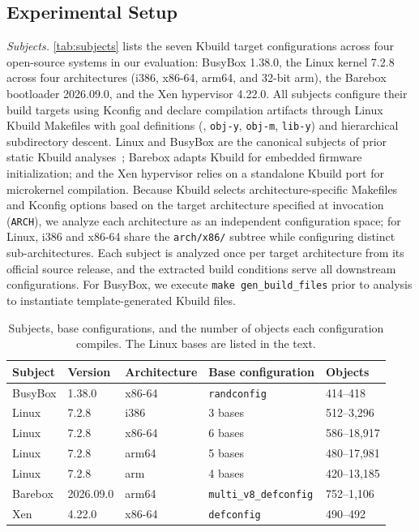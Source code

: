 \documentclass[acmsmall,screen,review,anonymous,nonacm]{acmart}
\begin{document}
\subsection{Experimental Setup}\label{sec:setup}

\emph{Subjects.}
\autoref{tab:subjects} lists the seven Kbuild target configurations across four open-source systems in our evaluation: BusyBox 1.38.0, the Linux kernel 7.2.8 across four architectures (i386, x86-64, arm64, and 32-bit arm), the Barebox bootloader 2026.09.0, and the Xen hypervisor 4.22.0.
All subjects configure their build targets using Kconfig and declare compilation artifacts through Linux Kbuild Makefiles with goal definitions (\eg, \texttt{obj-y}, \texttt{obj-m}, \texttt{lib-y}) and hierarchical subdirectory descent.
Linux and BusyBox are the canonical subjects of prior static Kbuild analyses~\cite{gazzillo2017kmax,nguyen2020kbuild}; Barebox adapts Kbuild for embedded firmware initialization; and the Xen hypervisor relies on a standalone Kbuild port for microkernel compilation.
Because Kbuild selects architecture-specific Makefiles and Kconfig options based on the target architecture specified at invocation (\texttt{ARCH}), we analyze each architecture as an independent configuration space; for Linux, i386 and x86-64 share the \texttt{arch/x86/} subtree while configuring distinct sub-architectures.
Each subject is analyzed once per target architecture from its official source release, and the extracted build conditions serve all downstream configurations.
For BusyBox, we execute \texttt{make gen\_build\_files} prior to analysis to instantiate template-generated Kbuild files.

\begin{table}[t]
\centering\footnotesize
\caption{Subjects, base configurations, and the number of objects each configuration compiles. The Linux bases are listed in the text.}
\label{tab:subjects}
\begin{tabular}{lllll}
\toprule
Subject & Version & Architecture & Base configuration & Objects \\
\midrule
BusyBox & 1.38.0 & x86-64 & \texttt{randconfig} & 414--418 \\
Linux & 7.2.8 & i386 & 3 bases & 512--3,296 \\
Linux & 7.2.8 & x86-64 & 6 bases & 586--18,917 \\
Linux & 7.2.8 & arm64 & 5 bases & 480--17,981 \\
Linux & 7.2.8 & arm & 4 bases & 420--13,185 \\
Barebox & 2026.09.0 & arm64 & \texttt{multi\_v8\_defconfig} & 752--1,106 \\
Xen & 4.22.0 & x86-64 & \texttt{defconfig} & 490--492 \\
\bottomrule
\end{tabular}
\end{table}
\end{document}
